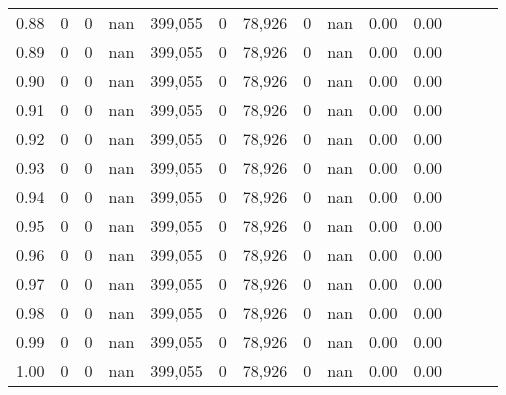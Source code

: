 \begin{tabular}{rrrrrrrrrrrrrr}
0.88 &        0 &       0 &   nan &  399,055 &        0 &  78,926 &       0 &   nan &  0.00 &      0.00 \\
0.89 &        0 &       0 &   nan &  399,055 &        0 &  78,926 &       0 &   nan &  0.00 &      0.00 \\
0.90 &        0 &       0 &   nan &  399,055 &        0 &  78,926 &       0 &   nan &  0.00 &      0.00 \\
0.91 &        0 &       0 &   nan &  399,055 &        0 &  78,926 &       0 &   nan &  0.00 &      0.00 \\
0.92 &        0 &       0 &   nan &  399,055 &        0 &  78,926 &       0 &   nan &  0.00 &      0.00 \\
0.93 &        0 &       0 &   nan &  399,055 &        0 &  78,926 &       0 &   nan &  0.00 &      0.00 \\
0.94 &        0 &       0 &   nan &  399,055 &        0 &  78,926 &       0 &   nan &  0.00 &      0.00 \\
0.95 &        0 &       0 &   nan &  399,055 &        0 &  78,926 &       0 &   nan &  0.00 &      0.00 \\
0.96 &        0 &       0 &   nan &  399,055 &        0 &  78,926 &       0 &   nan &  0.00 &      0.00 \\
0.97 &        0 &       0 &   nan &  399,055 &        0 &  78,926 &       0 &   nan &  0.00 &      0.00 \\
0.98 &        0 &       0 &   nan &  399,055 &        0 &  78,926 &       0 &   nan &  0.00 &      0.00 \\
0.99 &        0 &       0 &   nan &  399,055 &        0 &  78,926 &       0 &   nan &  0.00 &      0.00 \\
1.00 &        0 &       0 &   nan &  399,055 &        0 &  78,926 &       0 &   nan &  0.00 &      0.00 \\
\bottomrule
\end{tabular}
